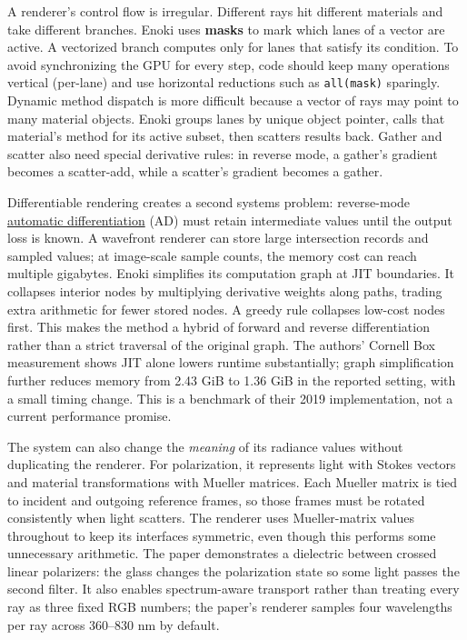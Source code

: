 A renderer's control flow is irregular. Different rays hit different materials and take different branches. Enoki uses \textbf{masks} to mark which lanes of a vector are active. A vectorized branch computes only for lanes that satisfy its condition. To avoid synchronizing the GPU for every step, code should keep many operations vertical (per-lane) and use horizontal reductions such as \texttt{all(mask)} sparingly. Dynamic method dispatch is more difficult because a vector of rays may point to many material objects. Enoki groups lanes by unique object pointer, calls that material's method for its active subset, then scatters results back. Gather and scatter also need special derivative rules: in reverse mode, a gather's gradient becomes a scatter-add, while a scatter's gradient becomes a gather.

Differentiable rendering creates a second systems problem: reverse-mode \hyperref[appendix-40df0855b4a7]{automatic differentiation} (AD) must retain intermediate values until the output loss is known. A wavefront renderer can store large intersection records and sampled values; at image-scale sample counts, the memory cost can reach multiple gigabytes. Enoki simplifies its computation graph at JIT boundaries. It collapses interior nodes by multiplying derivative weights along paths, trading extra arithmetic for fewer stored nodes. A greedy rule collapses low-cost nodes first. This makes the method a hybrid of forward and reverse differentiation rather than a strict traversal of the original graph. The authors' Cornell Box measurement shows JIT alone lowers runtime substantially; graph simplification further reduces memory from 2.43 GiB to 1.36 GiB in the reported setting, with a small timing change. This is a benchmark of their 2019 implementation, not a current performance promise.

The system can also change the \emph{meaning} of its radiance values without duplicating the renderer. For polarization, it represents light with Stokes vectors and material transformations with Mueller matrices. Each Mueller matrix is tied to incident and outgoing reference frames, so those frames must be rotated consistently when light scatters. The renderer uses Mueller-matrix values throughout to keep its interfaces symmetric, even though this performs some unnecessary arithmetic. The paper demonstrates a dielectric between crossed linear polarizers: the glass changes the polarization state so some light passes the second filter. It also enables spectrum-aware transport rather than treating every ray as three fixed RGB numbers; the paper's renderer samples four wavelengths per ray across 360--830 nm by default.

